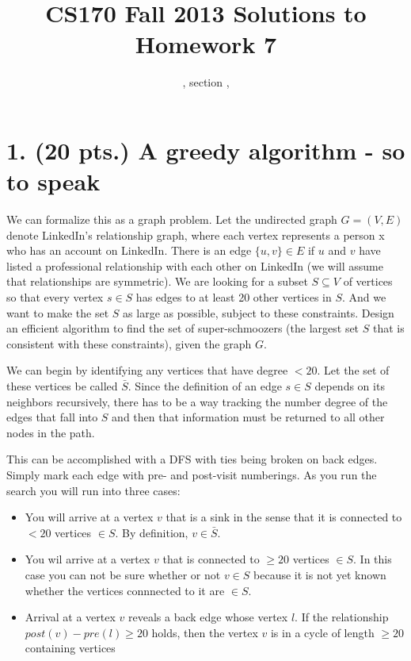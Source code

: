 \documentclass[11pt]{article}
\title{CS170  Fall 2013 Solutions to Homework 7}
\author{\Name, section \Sec, \texttt{\Login}}
\begin{document}
\maketitle

\section*{1. (20 pts.) A greedy algorithm - so to speak}

We can formalize this as a graph problem. Let the undirected graph
 $G = (V,E)$ denote LinkedIn's relationship graph, where each vertex represents a person x
who has an account on LinkedIn. 
There is an edge $\{u, v\} \in E$ if $u$ and $v$ have listed a professional 
relationship with each other on LinkedIn (we will assume that relationships are symmetric). 
We are looking for a subset $S \subseteq V$ of vertices so that every vertex $s \in S$
 has edges to at least 20 other vertices in $S$. 
And we want to make the set $S$ as large as possible, subject to these constraints.
Design an efficient algorithm to find the set of super-schmoozers (the largest set $S$
 that is consistent with these constraints), given the graph $G$.

We can begin by identifying any vertices that have degree $< 20$.  Let the set of these
vertices be called $\bar{S}$.
Since the definition of an edge $s\in S$ depends on its neighbors recursively, 
there has to be a way tracking the number degree of the edges that fall into $S$ and then
that information must be returned to all other nodes in the path. 

This can be accomplished with a DFS with ties being broken on back edges. Simply mark each 
edge with pre- and post-visit numberings. As you run the search you will run into three cases:

\begin{itemize}
\item You will arrive at a vertex $v$ that is a sink in the sense that it is connected to 
$< 20$ vertices $\in S$. By definition, $v \in \bar{S}$.

\item You wil arrive at a vertex $v$ that is connected to $\geq 20$ vertices $\in S$. 
In this case you can not be sure whether or not $v\in S$ because it is not yet known
whether the vertices connnected to it are $\in S$.

\item Arrival at a vertex $v$ reveals a back edge whose vertex $l$. If the relationship
$post(v) - pre(l) \geq 20$ holds, then the vertex $v$ is in a cycle of length $\geq 20$ 
containing vertices   
\end{itemize}
\end{document}
